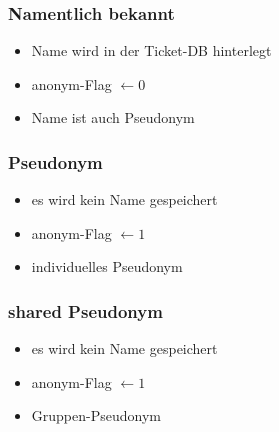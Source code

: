 
\begin{frame}
	\frametitle{Namentlich bekannt}
	\begin{itemize}
		\item<2-> Name wird in der Ticket-DB hinterlegt
		\item<3-> anonym-Flag $\leftarrow 0$ 
		\item<4-> Name ist auch Pseudonym
	\end{itemize}
\end{frame}


\begin{frame}
	\frametitle{Pseudonym}
	\begin{itemize}
		\item<2-> es wird kein Name gespeichert
		\item<3-> anonym-Flag $\leftarrow 1$  
		\item<4-> individuelles Pseudonym
	\end{itemize}
\end{frame}


\begin{frame}
	\frametitle{shared Pseudonym}
	\begin{itemize}
		\item<2-> es wird kein Name gespeichert
		\item<3-> anonym-Flag $\leftarrow 1$  
		\item<4-> Gruppen-Pseudonym  
	\end{itemize}
\end{frame}

